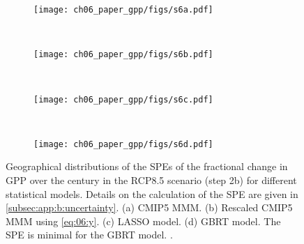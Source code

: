 \begin{figure}[p]
  \centering
  \begin{subfigure}[b]{\SubfigureWidth{}}
    \texttt{[image: ch06\_paper\_gpp/figs/s6a.pdf]}
    \caption{}
    \label{fig:app:b:step2b_results_errors:a}
  \end{subfigure}
  ~
  \begin{subfigure}[b]{\SubfigureWidth{}}
    \texttt{[image: ch06\_paper\_gpp/figs/s6b.pdf]}
    \caption{}
    \label{fig:app:b:step2b_results_errors:b}
  \end{subfigure}
  \\
  \begin{subfigure}[b]{\SubfigureWidth{}}
    \texttt{[image: ch06\_paper\_gpp/figs/s6c.pdf]}
    \caption{}
    \label{fig:app:b:step2b_results_errors:c}
  \end{subfigure}
  ~
  \begin{subfigure}[b]{\SubfigureWidth{}}
    \texttt{[image: ch06\_paper\_gpp/figs/s6d.pdf]}
    \caption{}
    \label{fig:app:b:step2b_results_errors:d}
  \end{subfigure}
  \caption{Geographical distributions of the \acfp{SPE} of the fractional
    change in \acf{GPP} over the  century in the \acs{RCP}8.5 scenario
    (step 2b) for different statistical models. Details on the calculation of
    the \acs{SPE} are given in \cref{subsec:app:b:uncertainty}. (a) \acs{CMIP}5
    \acf{MMM}. (b) Rescaled \acs{CMIP}5 \acs{MMM} using \cref{eq:06:y}. (c)
    \Acf{LASSO} model. (d) \Acf{GBRT} model. The \acs{SPE} is minimal for the
    \acs{GBRT} model. .}
  \label{fig:app:b:step2b_results_errors}
\end{figure}


\endgroup
